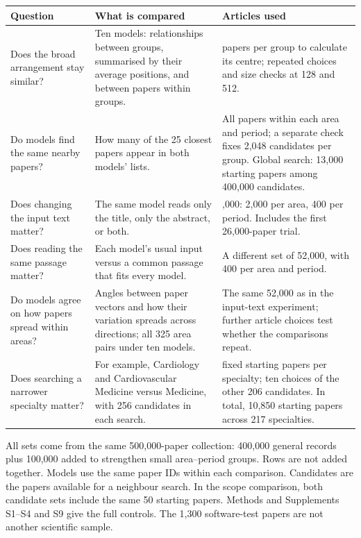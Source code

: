 \begin{table}[!htbp]
\par\noindent\begin{minipage}{\linewidth}
\small
\setlength{\tabcolsep}{4pt}
\renewcommand{\arraystretch}{1.10}
\label{tab:T01}
\begin{tabular}{@{}>{\raggedright\arraybackslash}p{4.0cm}>{\raggedright\arraybackslash}p{5.4cm}>{\raggedright\arraybackslash}p{5.75cm}@{}}
\toprule
\textbf{Question} & \textbf{What is compared} & \textbf{Articles used} \\
\midrule
Does the broad arrangement stay similar? & Ten models: relationships between groups, summarised by their average positions, and between papers within groups. & 256 papers per group to calculate its centre; repeated choices and size checks at 128 and 512. \\
\addlinespace[8pt]
Do models find the same nearby papers? & How many of the 25 closest papers appear in both models' lists. & All papers within each area and period; a separate check fixes 2,048 candidates per group. Global search: 13,000 starting papers among 400,000 candidates. \\
\addlinespace[8pt]
Does changing the input text matter? & The same model reads only the title, only the abstract, or both. & 52,000: 2,000 per area, 400 per period. Includes the first 26,000-paper trial. \\
\addlinespace[8pt]
Does reading the same passage matter? & Each model's usual input versus a common passage that fits every model. & A different set of 52,000, with 400 per area and period. \\
\addlinespace[8pt]
Do models agree on how papers spread within areas? & Angles between paper vectors and how their variation spreads across directions; all 325 area pairs under ten models. & The same 52,000 as in the input-text experiment; further article choices test whether the comparisons repeat. \\
\addlinespace[8pt]
Does searching a narrower specialty matter? & For example, Cardiology and Cardiovascular Medicine versus Medicine, with 256 candidates in each search. & 50 fixed starting papers per specialty; ten choices of the other 206 candidates. In total, 10,850 starting papers across 217 specialties. \\
\bottomrule
\end{tabular}
\par\smallskip
All sets come from the same 500,000-paper collection: 400,000 general records plus 100,000 added to strengthen small area--period groups. Rows are not added together. Models use the same paper IDs within each comparison. Candidates are the papers available for a neighbour search. In the scope comparison, both candidate sets include the same 50 starting papers. Methods and Supplements S1--S4 and S9 give the full controls. The 1,300 software-test papers are not another scientific sample.
\end{minipage}\par
\end{table}
